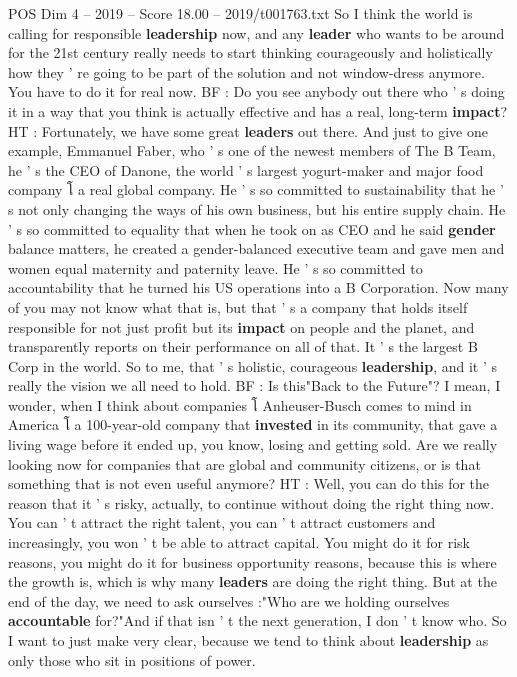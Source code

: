 \begin{textsample}{POS Dim 4 – 2019 – Score 18.00 – 2019/t001763.txt}
So I think the world is calling for responsible \textbf{leadership} now, and any \textbf{leader} who wants to be around for the 21st century really needs to start thinking courageously and holistically how they ' re going to be part of the solution and not window-dress anymore.
You have to do it for real now.
BF : Do you see anybody out there who ' s doing it in a way that you think is actually effective and has a real, long-term \textbf{impact}?
HT : Fortunately, we have some great \textbf{leaders} out there.
And just to give one example, Emmanuel Faber, who ' s one of the newest members of The B Team, he ' s the CEO of Danone, the world ' s largest yogurt-maker and major food company โ a real global company.
He ' s so committed to sustainability that he ' s not only changing the ways of his own business, but his entire supply chain.
He ' s so committed to equality that when he took on as CEO and he said \textbf{gender} balance matters, he created a gender-balanced executive team and gave men and women equal maternity and paternity leave.
He ' s so committed to accountability that he turned his US operations into a B Corporation.
Now many of you may not know what that is, but that ' s a company that holds itself responsible for not just profit but its \textbf{impact} on people and the planet, and transparently reports on their performance on all of that.
It ' s the largest B Corp in the world.
So to me, that ' s holistic, courageous \textbf{leadership}, and it ' s really the vision we all need to hold.
BF : Is this"Back to the Future"?
I mean, I wonder, when I think about companies โ Anheuser-Busch comes to mind in America โ a 100-year-old company that \textbf{invested} in its community, that gave a living wage before it ended up, you know, losing and getting sold.
Are we really looking now for companies that are global and community citizens, or is that something that is not even useful anymore?
HT : Well, you can do this for the reason that it ' s risky, actually, to continue without doing the right thing now.
You can ' t attract the right talent, you can ' t attract customers and increasingly, you won ' t be able to attract capital.
You might do it for risk reasons, you might do it for business opportunity reasons, because this is where the growth is, which is why many \textbf{leaders} are doing the right thing.
But at the end of the day, we need to ask ourselves :"Who are we holding ourselves \textbf{accountable} for?"And if that isn ' t the next generation, I don ' t know who.
So I want to just make very clear, because we tend to think about \textbf{leadership} as only those who sit in positions of power.

\end{textsample}
